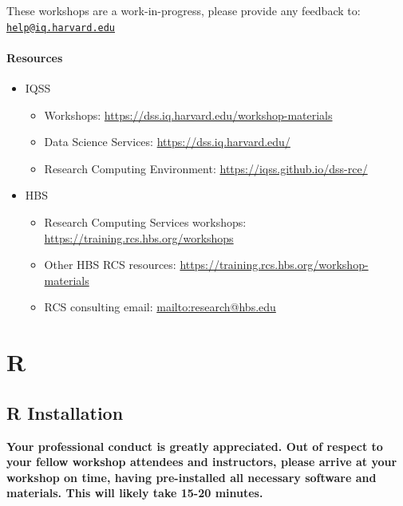 \documentclass[
]{book}
\providecommand{\tightlist}{%
  \setlength{\itemsep}{0pt}\setlength{\parskip}{0pt}}
\begin{document}
These workshops are a work-in-progress, please provide any feedback to: \href{mailto:help@iq.harvard.edu}{\nolinkurl{help@iq.harvard.edu}}

\hypertarget{resources}{%
\subsection{Resources}\label{resources}}

\begin{itemize}
\tightlist
\item
  IQSS

  \begin{itemize}
  \tightlist
  \item
    Workshops: \url{https://dss.iq.harvard.edu/workshop-materials}
  \item
    Data Science Services: \url{https://dss.iq.harvard.edu/}
  \item
    Research Computing Environment: \url{https://iqss.github.io/dss-rce/}
  \end{itemize}
\item
  HBS

  \begin{itemize}
  \tightlist
  \item
    Research Computing Services workshops: \url{https://training.rcs.hbs.org/workshops}
  \item
    Other HBS RCS resources: \url{https://training.rcs.hbs.org/workshop-materials}
  \item
    RCS consulting email: \url{mailto:research@hbs.edu}
  \end{itemize}
\end{itemize}

\hypertarget{part-r}{%
\part{R}\label{part-r}}

\hypertarget{r-installation}{%
\chapter{R Installation}\label{r-installation}}

\begin{alert}

\textbf{Your professional conduct is greatly appreciated. Out of respect to your fellow workshop attendees and instructors, please arrive at your workshop on time, having pre-installed all necessary software and materials. This will likely take 15-20 minutes.}

\end{alert}
\end{document}
